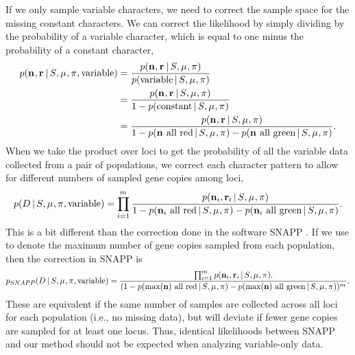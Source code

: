 If we only sample variable characters, we need to correct the sample space for
the missing constant characters.
We can correct the likelihood by simply dividing by the probability of a
variable character, which is equal to one minus the probability of a constant
character,
\begin{equation}
\begin{split}
    \pr(\leafallelecounts, \leafredallelecounts \given \sptree, \murate, \gfreq, \textrm{variable})
    & =
    \frac{
        \pr(\leafallelecounts, \leafredallelecounts \given \sptree, \murate, \gfreq)
    }{
        \pr(\textrm{variable} \given \sptree, \murate, \gfreq)
    } \\
    & =
    \frac{
        \pr(\leafallelecounts, \leafredallelecounts \given \sptree, \murate, \gfreq)
    }{
        1 - \pr(\textrm{constant} \given \sptree, \murate, \gfreq)
    } \\
    & =
    \frac{
        \pr(\leafallelecounts, \leafredallelecounts \given \sptree, \murate, \gfreq)
    }{
        1 - \pr(\leafallelecounts \textrm{ all red} \given \sptree, \murate, \gfreq)
        - \pr(\leafallelecounts \textrm{ all green} \given \sptree, \murate, \gfreq)
    }.
    \label{eq:variablemarkerlikelihood}
\end{split}
\end{equation}
When we take the product over loci to get the probability of all the variable
data collected from a pair of populations, we correct each character pattern to
allow for different numbers of sampled gene copies among loci,
\begin{equation}
    \pr(\comparisondata \given \sptree, \murate, \gfreq, \textrm{variable})
    =
    \prod_{i=1}^{\nloci}
    \frac{
        \pr(\leafallelecounts[i], \leafredallelecounts[i] \given \sptree, \murate, \gfreq)
    }{
        1 - \pr(\leafallelecounts[i] \textrm{ all red} \given \sptree, \murate, \gfreq)
        - \pr(\leafallelecounts[i] \textrm{ all green} \given \sptree, \murate, \gfreq)
    }.
    \label{eq:variablecomparisonlikelihood}
\end{equation}
This is a bit different than the correction done in the software SNAPP
\citep{Bryant2012}.
If we use \maxleafallelecounts to denote the maximum number of gene copies
sampled from each population, then the correction in SNAPP is
\begin{equation}
    \pr_{\tiny SNAPP}(\comparisondata \given \sptree, \murate, \gfreq, \textrm{variable})
    =
    \frac{
        \prod_{i=1}^{\nloci}
        \pr(\leafallelecounts[i], \leafredallelecounts[i] \given \sptree, \murate, \gfreq).
    }{
        (1 - \pr(\maxleafallelecounts \textrm{ all red} \given \sptree, \murate, \gfreq)
        - \pr(\maxleafallelecounts \textrm{ all green} \given \sptree, \murate, \gfreq))^{\nloci}
    }.
    \label{eq:snappvariablecomparisonlikelihood}
\end{equation}
These are equivalent if the same number of samples are collected across all
loci for each population (i.e., no missing data), but will deviate if fewer
gene copies are sampled for at least one locus.
Thus, identical likelihoods between SNAPP and our method should not be expected
when analyzing variable-only data.

